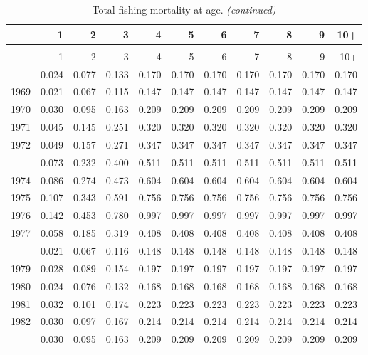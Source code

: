 \documentclass[
]{article}
\begin{document}
\begin{longtable}[t]{lrrrrrrrrrr}
\caption{\label{tab:FAA-tot-table}Total fishing mortality at age.}\\
\toprule
  & 1 & 2 & 3 & 4 & 5 & 6 & 7 & 8 & 9 & 10+\\
\midrule
\endfirsthead
\caption[]{Total fishing mortality at age. \textit{(continued)}}\\
\toprule
  & 1 & 2 & 3 & 4 & 5 & 6 & 7 & 8 & 9 & 10+\\
\midrule
\endhead

\endfoot
\bottomrule
\endlastfoot
1968 & 0.024 & 0.077 & 0.133 & 0.170 & 0.170 & 0.170 & 0.170 & 0.170 & 0.170 & 0.170\\
1969 & 0.021 & 0.067 & 0.115 & 0.147 & 0.147 & 0.147 & 0.147 & 0.147 & 0.147 & 0.147\\
1970 & 0.030 & 0.095 & 0.163 & 0.209 & 0.209 & 0.209 & 0.209 & 0.209 & 0.209 & 0.209\\
1971 & 0.045 & 0.145 & 0.251 & 0.320 & 0.320 & 0.320 & 0.320 & 0.320 & 0.320 & 0.320\\
1972 & 0.049 & 0.157 & 0.271 & 0.347 & 0.347 & 0.347 & 0.347 & 0.347 & 0.347 & 0.347\\
\addlinespace
1973 & 0.073 & 0.232 & 0.400 & 0.511 & 0.511 & 0.511 & 0.511 & 0.511 & 0.511 & 0.511\\
1974 & 0.086 & 0.274 & 0.473 & 0.604 & 0.604 & 0.604 & 0.604 & 0.604 & 0.604 & 0.604\\
1975 & 0.107 & 0.343 & 0.591 & 0.756 & 0.756 & 0.756 & 0.756 & 0.756 & 0.756 & 0.756\\
1976 & 0.142 & 0.453 & 0.780 & 0.997 & 0.997 & 0.997 & 0.997 & 0.997 & 0.997 & 0.997\\
1977 & 0.058 & 0.185 & 0.319 & 0.408 & 0.408 & 0.408 & 0.408 & 0.408 & 0.408 & 0.408\\
\addlinespace
1978 & 0.021 & 0.067 & 0.116 & 0.148 & 0.148 & 0.148 & 0.148 & 0.148 & 0.148 & 0.148\\
1979 & 0.028 & 0.089 & 0.154 & 0.197 & 0.197 & 0.197 & 0.197 & 0.197 & 0.197 & 0.197\\
1980 & 0.024 & 0.076 & 0.132 & 0.168 & 0.168 & 0.168 & 0.168 & 0.168 & 0.168 & 0.168\\
1981 & 0.032 & 0.101 & 0.174 & 0.223 & 0.223 & 0.223 & 0.223 & 0.223 & 0.223 & 0.223\\
1982 & 0.030 & 0.097 & 0.167 & 0.214 & 0.214 & 0.214 & 0.214 & 0.214 & 0.214 & 0.214\\
\addlinespace
1983 & 0.030 & 0.095 & 0.163 & 0.209 & 0.209 & 0.209 & 0.209 & 0.209 & 0.209 & 0.209\\

\end{longtable}
\end{document}
